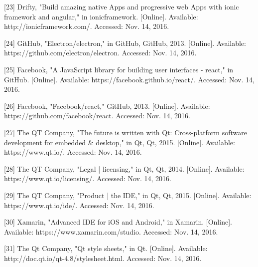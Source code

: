 \documentclass[10pt,draftclsnofoot,onecolumn]{IEEEtran}
\begin{document}
[23] Drifty, "Build amazing native Apps and progressive web Apps with ionic framework and angular," in ionicframework. [Online]. Available: http://ionicframework.com/. Accessed: Nov. 14, 2016.\\
 \vspace{2mm}


[24] GitHub, "Electron/electron," in GitHub, GitHub, 2013. [Online]. Available: https://github.com/electron/electron. Accessed: Nov. 14, 2016.\\
 \vspace{2mm}


[25] Facebook, "A JavaScript library for building user interfaces - react," in GitHub. [Online]. Available: https://facebook.github.io/react/. Accessed: Nov. 14, 2016.\\
 \vspace{2mm}


[26] Facebook, "Facebook/react," GitHub, 2013. [Online]. Available: https://github.com/facebook/react. Accessed: Nov. 14, 2016.\\
 \vspace{2mm}


[27] The QT Company, "The future is written with Qt: Cross-platform software development for embedded & desktop," in Qt, Qt, 2015. [Online]. Available: https://www.qt.io/. Accessed: Nov. 14, 2016.\\
 \vspace{2mm}


[28] The QT Company, "Legal | licensing," in Qt, Qt, 2014. [Online]. Available: https://www.qt.io/licensing/. Accessed: Nov. 14, 2016.\\
 \vspace{2mm}


[29] The QT Company, "Product | the IDE," in Qt, Qt, 2015. [Online]. Available: https://www.qt.io/ide/. Accessed: Nov. 14, 2016.\\
 \vspace{2mm}


[30] Xamarin, "Advanced IDE for iOS and Android," in Xamarin. [Online]. Available: https://www.xamarin.com/studio. Accessed: Nov. 14, 2016.\\
 \vspace{2mm}


[31] The Qt Company, "Qt style sheets," in Qt. [Online]. Available: http://doc.qt.io/qt-4.8/stylesheet.html. Accessed: Nov. 14, 2016.\\
 \vspace{2mm}
\end{document}
